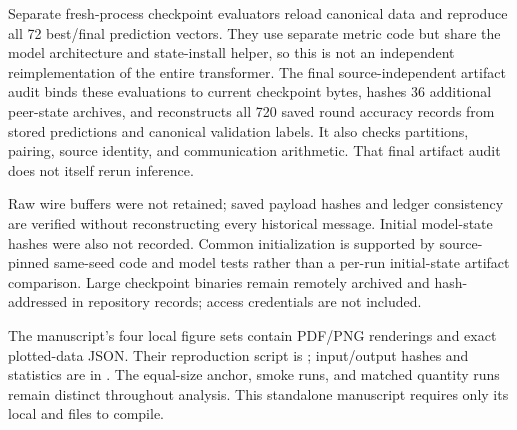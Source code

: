 \documentclass[11pt]{article}
\begin{document}
Separate fresh-process checkpoint evaluators reload canonical data and reproduce all 72 best/final prediction vectors. They use separate metric code but share the model architecture and state-install helper, so this is not an independent reimplementation of the entire transformer. The final source-independent artifact audit binds these evaluations to current checkpoint bytes, hashes 36 additional peer-state archives, and reconstructs all 720 saved round accuracy records from stored predictions and canonical validation labels. It also checks partitions, pairing, source identity, and communication arithmetic. That final artifact audit does not itself rerun inference.

Raw wire buffers were not retained; saved payload hashes and ledger consistency are verified without reconstructing every historical message. Initial model-state hashes were also not recorded. Common initialization is supported by source-pinned same-seed code and model tests rather than a per-run initial-state artifact comparison. Large checkpoint binaries remain remotely archived and hash-addressed in repository records; access credentials are not included.

The manuscript's four local figure sets contain PDF/PNG renderings and exact plotted-data JSON. Their reproduction script is ; input/output hashes and statistics are in . The equal-size anchor, smoke runs, and matched quantity runs remain distinct throughout analysis. This standalone manuscript requires only its local  and  files to compile.



\end{document}

